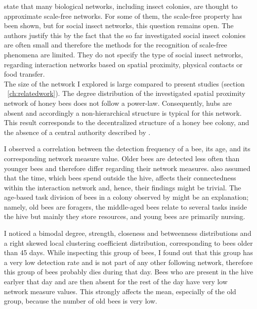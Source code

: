 \textcite{charbonneau2013social} state that many biological networks, including insect colonies, are thought to approximate scale-free networks.
For some of them, the scale-free property has been shown, but for social insect networks, this question remains open.
The authors justify this by the fact that the so far investigated social insect colonies are often small and therefore the methods for the recognition of scale-free phenomena are limited.
They do not specify the type of social insect networks, regarding interaction networks based on spatial proximity, physical contacts or food transfer.\\
The size of the network I explored is large compared to present studies (section ~\ref{ch:relatedwork}). The degree distribution of the investigated spatial proximity network of honey bees does not follow a power-law. Consequently, hubs are absent and accordingly a non-hierarchical structure is typical for this network. This result
corresponds to the decentralized structure of a honey bee colony, and the absence of a central authority described by \textcite{seeley1989honey}.

I observed a correlation between the detection frequency of a bee, its age, and its corresponding network measure value. Older bees are detected less often than younger bees and therefore differ regarding their network measures.
\textcite{baracchi2014socio} also assumed that the time, which bees spend outside the hive, affects their connectedness within the interaction network and, hence, their findings might be trivial.
The age-based task division of bees in a colony observed by \textcite{seeley1989social} might be an explanation; namely, old bees are foragers, the middle-aged bees relate to several tasks inside the hive but mainly they store resources, and young bees are primarily nursing.

I noticed a bimodal degree, strength, closeness and betweenness distributions and a right skewed local clustering coefficient distribution, corresponding to bees older than 45 days.
While inspecting this group of bees, I found out that this group has a very low detection rate and is not part of any other following network, therefore this group of bees probably dies during that day. Bees who are present in the hive earlyer that day and are then absent for the rest of the day have very low network measure values. This strongly affects the mean, especially of the old group, because the number of old bees is very low.


